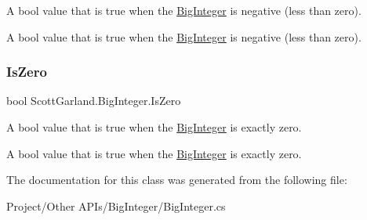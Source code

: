 A bool value that is true when the \hyperlink{class_scott_garland_1_1_big_integer}{Big\+Integer} is negative (less than zero). 

A bool value that is true when the \hyperlink{class_scott_garland_1_1_big_integer}{Big\+Integer} is negative (less than zero). \mbox{\label{class_scott_garland_1_1_big_integer_ad925705201ff656dc819599e78a19ccd}} 
\subsubsection{\texorpdfstring{Is\+Zero}{IsZero}}
{\footnotesize\ttfamily bool Scott\+Garland.\+Big\+Integer.\+Is\+Zero\hspace{0.3cm}{\ttfamily [get]}}



A bool value that is true when the \hyperlink{class_scott_garland_1_1_big_integer}{Big\+Integer} is exactly zero. 

A bool value that is true when the \hyperlink{class_scott_garland_1_1_big_integer}{Big\+Integer} is exactly zero. 

The documentation for this class was generated from the following file\+:\begin{DoxyCompactItemize}
\item 
Project/\+Other A\+P\+Is/\+Big\+Integer/Big\+Integer.\+cs\end{DoxyCompactItemize}
